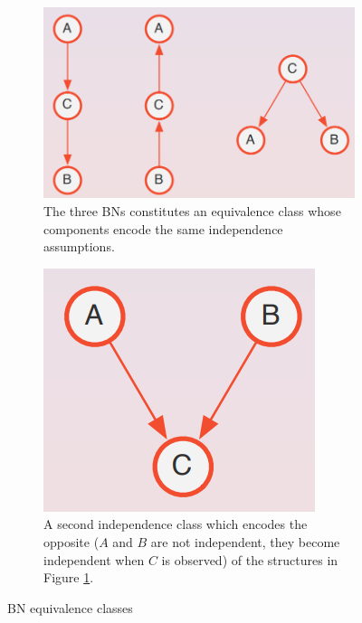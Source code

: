 \begin{figure}[H]
	\centering
	\begin{subfigure}
		[t]{0.49\textwidth}
		\centering
		\includegraphics[width=\textwidth]{
			images/08_BayesianNetworks_exampleEquivalentClasses1.png
		}
		\caption{The three BNs constitutes an equivalence class whose components
		encode the same independence assumptions.}
		\label{fig:exampleIEquivalentBN}
	\end{subfigure}
	\hfill
	\begin{subfigure}
		[t]{0.49\textwidth}
		\centering
		\includegraphics[width=0.7\linewidth]{
			images/08_BayesianNetworks_exampleEquivalentClasses2.png
		}
		\caption{A second independence class which encodes the opposite ($A$ and $B$
		are not independent, they become independent when $C$ is observed) of the structures
		in Figure \ref{fig:exampleIEquivalentBN}.}

		\label{fig:exampleIEquivalentBN2}
	\end{subfigure}

	\caption{BN equivalence classes}
	\label{fig:BNequivalenceclasses}
\end{figure}

